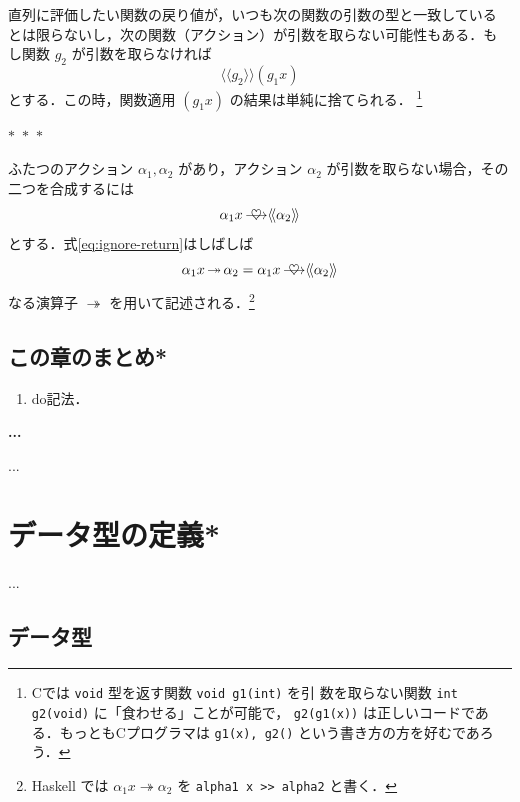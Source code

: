 \documentclass[a5paper,twoside,fleqn,draft]{jsbook}
\newcommand{\Langle}{\langle\!\langle}
\newcommand{\Rangle}{\rangle\!\rangle}
\newcommand{\separator}{\begin{center}$*$~$*$~$*$\end{center}}
\newcommand{\programminglanguage}[1]{\textsf{#1}}
\newcommand{\clang}{\programminglanguage{C}}
\newcommand{\haskell}{\programminglanguage{Haskell}}
\newenvironment{note}[1]{\begin{boxnote}\begin{center}\textbf{#1}\end{center}}{\end{boxnote}}
\newcommand{\code}[1]{\texttt{#1}}
\DeclareMathOperator{\mBind}{\heartsuit}
\DeclareMathOperator{\mBindRight}{\ooalign{$\longrightarrow$\crcr\hss$\mBind$\hss}}
\DeclareMathOperator{\mBindRightIgnore}{\twoheadrightarrow}
\newcommand{\mFuncWith}[1]{\Langle#1\Rangle}
\begin{document}
直列に評価したい関数の戻り値が，いつも次の関数の引数の型と一致している
とは限らないし，次の関数（アクション）が引数を取らない可能性もある．も
し関数 $g_2$ が引数を取らなければ
\begin{equation}
\mFuncWith{g_2}(g_1x)
\end{equation}
とする．この時，関数適用 $(g_1x)$ の結果は単純に捨てられる．
\footnote{\clang では \code{void} 型を返す関数 \code{void g1(int)} を引
  数を取らない関数 \code{int g2(void)} に「食わせる」ことが可能で，
  \code{g2(g1(x))} は正しいコードである．もっとも\clang プログラマは
  \code{g1(x), g2()} という書き方の方を好むであろう．}

\separator

ふたつのアクション $\alpha_1,\alpha_2$ があり，アクション $\alpha_2$
が引数を取らない場合，その二つを合成するには
\begin{equation}
\label{eq:ignore-return}
\alpha_1 x\mBindRight\mFuncWith{\alpha_2}
\end{equation}
とする．式\eqref{eq:ignore-return}はしばしば
\begin{equation}
\alpha_1 x\mBindRightIgnore\alpha_2=\alpha_1x\mBindRight\mFuncWith{\alpha_2}
\end{equation}
なる演算子 $\mBindRightIgnore$ を用いて記述される．\footnote{\haskell
  では $\alpha_1x\mBindRightIgnore\alpha_2$ を \code{alpha1 x >>
    alpha2} と書く．}

\section{この章のまとめ*}

\begin{enumerate}
\item do記法．
\end{enumerate}

\begin{note}{...}
...
\end{note}


\chapter{データ型の定義*}

...

\section{データ型}
\end{document}
